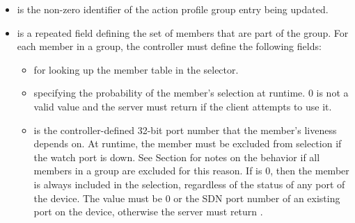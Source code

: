\documentclass[11pt]{article}
\begin{document}
{\begin{itemize}
\item{}
 is the non-zero  identifier of the action profile group
entry being updated.%

\item{}
 is a repeated field defining the set of members that are part of the
group. For each member in a group, the controller must define the following
fields:%

\begin{itemize}[noitemsep,topsep=\mdcompacttopsep]%

\item{} for looking up the member table in the selector.%

\item{} specifying the probability of the member's selection at
runtime. 0 is not a valid  value and the server must return
 if the client attempts to use it.%

\item{} is the controller-defined 32-bit port number that the member's
liveness depends on. At runtime, the member must be excluded from
selection if the watch port is down.  See Section
 for notes on the behavior if all members in
a group are excluded for this reason. If  is 0, then the member is
always included in the selection, regardless of the status of any port of
the device.  The value must be 0 or the SDN port number of an existing
port on the device, otherwise the server must return .%
\end{itemize}%


\end{itemize}}
\end{document}
